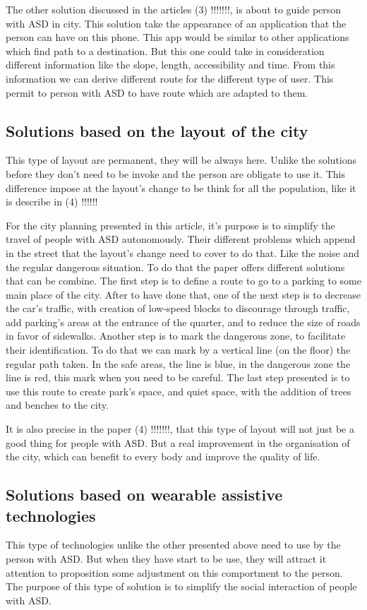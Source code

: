 The other solution discussed in the articles (3) !!!!!!!, is about to guide person with ASD in city. This solution take the appearance of an application that the person can have on this phone. This app would be similar to other applications which find path to a destination. But this one could take in consideration different information like the slope, length, accessibility and time. From this information we can derive different route for the different type of user. This permit to person with ASD to have route which are adapted to them.

\subsection{Solutions based on the layout of the city}

This type of layout are permanent, they will be always here. Unlike the solutions before they don't need to be invoke and the person are obligate to use it. This difference impose at the layout's change to be think for all the population, like it is describe in (4) !!!!!!

For the city planning presented in this article, it's purpose is to simplify the travel of people with ASD autonomously. Their different problems which append in the street that the layout's change need to cover to do that. Like the noise and the regular dangerous situation. To do that the paper offers different solutions that can be combine. The first step is to define a route to go to a parking to some main place of the city. After to have done that, one of the next step is to decrease the car’s traffic, with creation of low-speed blocks to discourage through traffic, add parking's areas at the entrance of the quarter, and to reduce the size of roads in favor of sidewalks. Another step is to mark the dangerous zone, to facilitate their identification. To do that we can mark by a vertical line (on the floor) the regular path taken. In the safe areas, the line is blue, in the dangerous zone the line is red, this mark when you need to be careful. The last step presented is to use this route to create park's space, and quiet space, with the addition of trees and benches to the city.

It is also precise in the paper (4) !!!!!!!, that this type of layout will not just be a good thing for people with ASD. But a real improvement in the organisation of the city, which can benefit to every body and improve the quality of life.

\subsection{Solutions based on wearable assistive technologies}
This type of technologies unlike the other presented above need to use by the person with ASD. But when they have start to be use, they will attract it attention to proposition some adjustment on this comportment to the person. The purpose of this type of solution is to simplify the social interaction of people with ASD.

